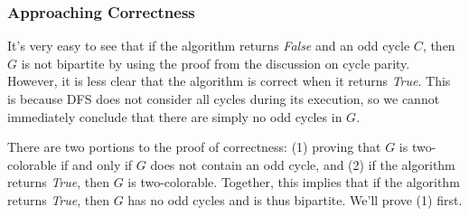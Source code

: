 \documentclass[11pt]{article}
\begin{document}
\IncMargin{2em}
\begin{algorithm}[H]
    \footnotesize
    \DontPrintSemicolon
    \BlankLine

    \BlankLine \BlankLine
\end{algorithm}\DecMargin{2em} 

\subsubsection{Approaching Correctness}
It's very easy to see that if the algorithm returns \emph{False} and an odd cycle $C$, then $G$ is not bipartite by using the proof from the discussion on cycle parity. However, it is less clear that the algorithm is correct when it returns \emph{True}. This is because DFS does not consider all cycles during its execution, so we cannot immediately conclude that there are simply no odd cycles in $G$. 

There are two portions to the proof of correctness: (1) proving that $G$ is two-colorable if and only if $G$ does not contain an odd cycle, and (2) if the algorithm returns \emph{True}, then $G$ is two-colorable. Together, this implies that if the algorithm returns \emph{True}, then $G$ has no odd cycles and is thus bipartite. We'll prove (1) first. 
\end{document}

